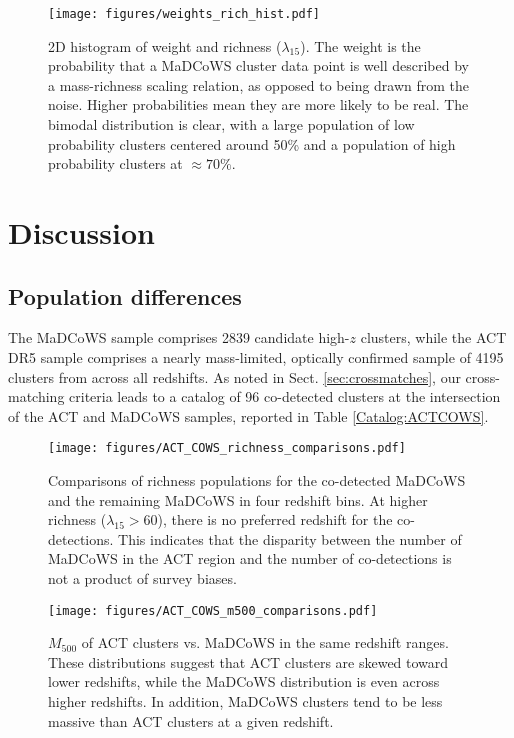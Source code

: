 \documentclass[longauth]{aa} %
\newcommand{\madcows}{MaDCoWS\xspace}
\begin{document}
\begin{figure}
    \centering
    \texttt{[image: figures/weights\_rich\_hist.pdf]}
    \caption{2D histogram of weight and richness ($\lambda_{15}$). The weight is the probability that a \madcows cluster data point is well described by a mass-richness scaling relation, as opposed to being drawn from the noise. Higher probabilities mean they are more likely to be real. The bimodal distribution is clear, with a large population of low probability clusters centered around 50\% and a population of high probability clusters at $\approx 70\%$.}
    \label{fig:prob_hist}
\end{figure}

\section{Discussion}\label{sec:discuss}

\subsection{Population differences}\label{sec:counts}

The MaDCoWS sample comprises 2839 candidate high-$z$ clusters, while the ACT DR5 sample comprises a nearly mass-limited, optically confirmed sample of 4195 clusters from across all redshifts. 
As noted in Sect. \ref{sec:crossmatches}, our cross-matching criteria leads to a catalog of 96 co-detected clusters at the intersection of the ACT and MaDCoWS samples, reported in Table \ref{Catalog:ACTCOWS}.

\begin{figure}
    \centering
    \texttt{[image: figures/ACT\_COWS\_richness\_comparisons.pdf]}
    \caption{Comparisons of richness populations for the co-detected \madcows and the remaining \madcows in four redshift bins. At higher richness ($\lambda_{15}>60$),  there is no preferred redshift for the co-detections. This indicates that the disparity between the number of \madcows in the ACT region and the number of co-detections is not a product of survey biases.}
    \label{fig:richness_histograms}
\end{figure}

\begin{figure}
    \centering
    \texttt{[image: figures/ACT\_COWS\_m500\_comparisons.pdf]}
    \caption{$M_{500}$ of ACT clusters vs. MaDCoWS in the same redshift ranges. These distributions suggest that ACT clusters are skewed toward lower redshifts, while the \madcows distribution is even across higher redshifts. In addition, \madcows clusters tend to be less massive than ACT clusters at a given redshift.}
    \label{fig:m500_histograms}
\end{figure}
\end{document}
